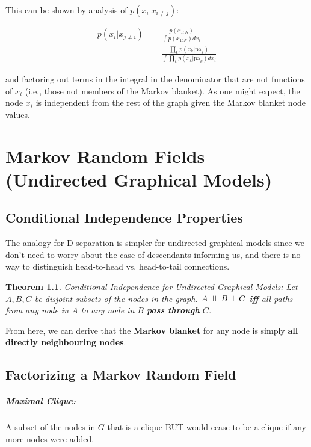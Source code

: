 \documentclass[a4paper,12pt]{report}
\newtheorem{theorem}{Theorem}
\begin{document}
This can be shown by analysis of $p(x_i|x_{i\neq j})$:

\begin{equation}
\begin{split}
p(x_i | x_{j\neq i}) &= \frac{p(x_{1:N})}{\int p(x_{1:N}) dx_i} \\
&= \frac{\prod_k p(x_k | \text{pa}_k)}{\int \prod_k p(x_k | \text{pa}_k) dx_i}
\end{split}
\end{equation}

and factoring out terms in the integral in the denominator that are not functions of $x_i$ (i.e., those not members of the Markov blanket). As one might expect, the node $x_i$ is independent from the rest of the graph given the Markov blanket node values.




\chapter{Markov Random Fields (Undirected Graphical Models)}

\section{Conditional Independence Properties}

The analogy for D-separation is simpler for undirected graphical models since we don't need to worry about the case of descendants informing us, and there is no way to distinguish head-to-head vs. head-to-tail connections.

\begin{theorem}{Conditional Independence for Undirected Graphical Models: }
Let $A,B,C$ be disjoint subsets of the nodes in the graph. $A\perp\!\!\!\perp B \perp C$ \textbf{iff} \textit{all paths} from any node in $A$ to any node in $B$ \textbf{pass through} $C$.
\end{theorem}

From here, we can derive that the \textbf{Markov blanket} for any node is simply \textbf{all directly neighbouring nodes}.


\section{Factorizing a Markov Random Field}

\paragraph{Maximal Clique: } A subset of the nodes in $G$ that is a clique BUT would cease to be a clique if any more nodes were added. 
\end{document}
